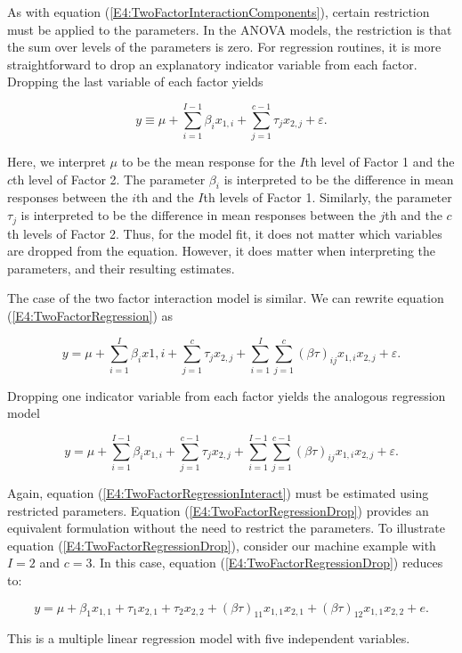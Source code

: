 As with equation (\ref{E4:TwoFactorInteractionComponents}), certain
restriction must be applied to the parameters. In the ANOVA models,
the restriction is that the sum over levels of the parameters is
zero. For regression routines, it is more straightforward to drop an
explanatory indicator variable from each factor. Dropping the last
variable of each factor yields

\begin{equation*}
y\equiv \mu +\sum_{i=1}^{I-1}\beta _{i}x_{1,i}+\sum_{j=1}^{c-1}\tau
_{j}x_{2,j} + \varepsilon.
\end{equation*}

\noindent Here, we interpret $\mu$ to be the mean response for the
$I$th level of Factor 1 and the $c$th level of Factor 2. The
parameter $\beta _{i}$ is interpreted to be the difference in mean
responses between the $i$th and the $I$th levels of Factor 1.
Similarly, the parameter $\tau _{j}$ is interpreted to be the
difference in mean responses between the $j$th and the $c$th levels
of Factor 2. Thus, for the model fit, it does not matter which
variables are dropped from the equation. However, it does matter
when interpreting the parameters, and their resulting estimates.

The case of the two factor interaction model is similar. We can
rewrite equation (\ref{E4:TwoFactorRegression}) as

\begin{equation} \label{E4:TwoFactorRegressionInteract}
y=\mu +\sum_{i=1}^{I}\beta _{i}x1,i+\sum_{j=1}^{c}\tau
_{j}x_{2,j}+\sum_{i=1}^{I}\sum_{j=1}^{c}(\beta \tau
)_{ij}x_{1,i}x_{2,j}+ \varepsilon.
\end{equation}

\noindent Dropping one indicator variable from each factor yields
the analogous regression model

\begin{equation}  \label{E4:TwoFactorRegressionDrop}
y=\mu +\sum_{i=1}^{I-1}\beta _{i}x_{1,i}+\sum_{j=1}^{c-1}\tau
_{j}x_{2,j}+\sum_{i=1}^{I-1}\sum_{j=1}^{c-1}(\beta \tau
)_{ij}x_{1,i}x_{2,j} + \varepsilon.
\end{equation}

Again, equation (\ref{E4:TwoFactorRegressionInteract}) must be
estimated using restricted parameters. Equation
(\ref{E4:TwoFactorRegressionDrop}) provides an equivalent
formulation without the need to restrict the parameters. To
illustrate equation (\ref{E4:TwoFactorRegressionDrop}), consider our
machine example with $I=2$ and $c=3$. In this case, equation
(\ref{E4:TwoFactorRegressionDrop}) reduces to:

\begin{equation*}
y=\mu +\beta _{1}x_{1,1}+\tau _{1}x_{2,1}+\tau _{2}x_{2,2}+(\beta
\tau )_{11}x_{1,1}x_{2,1}+(\beta \tau )_{12}x_{1,1}x_{2,2}+e.
\end{equation*}

\noindent This is a multiple linear regression model with five
independent variables.
